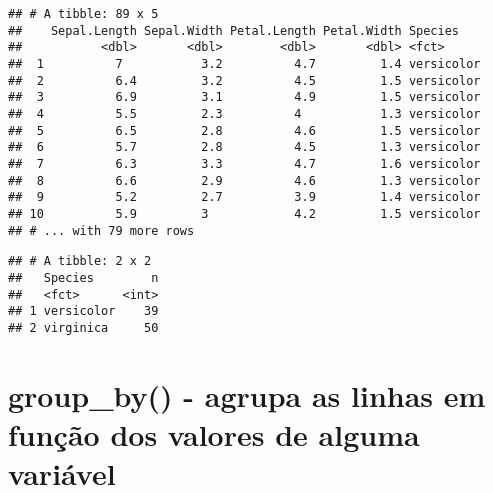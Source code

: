 \documentclass[]{book}
\newenvironment{Shaded}{\begin{snugshade}}{\end{snugshade}}
\newcommand{\CommentTok}[1]{\textcolor[rgb]{0.56,0.35,0.01}{\textit{#1}}}
\newcommand{\KeywordTok}[1]{\textcolor[rgb]{0.13,0.29,0.53}{\textbf{#1}}}
\newcommand{\NormalTok}[1]{#1}
\newcommand{\OperatorTok}[1]{\textcolor[rgb]{0.81,0.36,0.00}{\textbf{#1}}}
\newcommand{\StringTok}[1]{\textcolor[rgb]{0.31,0.60,0.02}{#1}}
\begin{document}
\begin{verbatim}
## # A tibble: 89 x 5
##    Sepal.Length Sepal.Width Petal.Length Petal.Width Species   
##           <dbl>       <dbl>        <dbl>       <dbl> <fct>     
##  1          7           3.2          4.7         1.4 versicolor
##  2          6.4         3.2          4.5         1.5 versicolor
##  3          6.9         3.1          4.9         1.5 versicolor
##  4          5.5         2.3          4           1.3 versicolor
##  5          6.5         2.8          4.6         1.5 versicolor
##  6          5.7         2.8          4.5         1.3 versicolor
##  7          6.3         3.3          4.7         1.6 versicolor
##  8          6.6         2.9          4.6         1.3 versicolor
##  9          5.2         2.7          3.9         1.4 versicolor
## 10          5.9         3            4.2         1.5 versicolor
## # ... with 79 more rows
\end{verbatim}

\begin{Shaded}
\end{Shaded}

\begin{verbatim}
## # A tibble: 2 x 2
##   Species        n
##   <fct>      <int>
## 1 versicolor    39
## 2 virginica     50
\end{verbatim}

\hypertarget{group_by---agrupa-as-linhas-em-funuxe7uxe3o-dos-valores-de-alguma-variuxe1vel}{%
\section{group\_by() - agrupa as linhas em função dos valores de alguma variável}\label{group_by---agrupa-as-linhas-em-funuxe7uxe3o-dos-valores-de-alguma-variuxe1vel}}

\begin{Shaded}
\end{Shaded}
\end{document}
